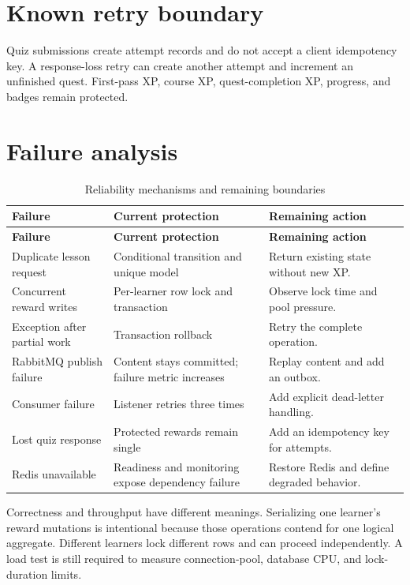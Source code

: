 \documentclass[12pt,a4paper,oneside]{report}
\begin{document}
\section{Known retry boundary}
Quiz submissions create attempt records and do not accept a client idempotency key.
A response-loss retry can create another attempt and increment an unfinished quest.
First-pass XP, course XP, quest-completion XP, progress, and badges remain protected.

\section{Failure analysis}
\begin{longtable}{P{0.27\textwidth}P{0.32\textwidth}P{0.30\textwidth}}
\caption{Reliability mechanisms and remaining boundaries}\\\toprule
\textbf{Failure} & \textbf{Current protection} & \textbf{Remaining action}\\\midrule\endfirsthead
\toprule\textbf{Failure} & \textbf{Current protection} & \textbf{Remaining action}\\\midrule\endhead
Duplicate lesson request & Conditional transition and unique model & Return existing state without new XP.\\
Concurrent reward writes & Per-learner row lock and transaction & Observe lock time and pool pressure.\\
Exception after partial work & Transaction rollback & Retry the complete operation.\\
RabbitMQ publish failure & Content stays committed; failure metric increases & Replay content and add an outbox.\\
Consumer failure & Listener retries three times & Add explicit dead-letter handling.\\
Lost quiz response & Protected rewards remain single & Add an idempotency key for attempts.\\
Redis unavailable & Readiness and monitoring expose dependency failure & Restore Redis and define degraded behavior.\\
\bottomrule
\end{longtable}

Correctness and throughput have different meanings. Serializing one learner's reward
mutations is intentional because those operations contend for one logical aggregate.
Different learners lock different rows and can proceed independently. A load test is
still required to measure connection-pool, database CPU, and lock-duration limits.
\end{document}
